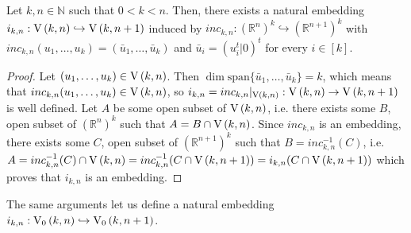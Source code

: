 \begin{lemma} Let $k,n\in\mathbb{N}$ such that $0<k<n$. Then, there exists a natural embedding $i_{k,n}:\St{k}{n}\hookrightarrow\St{k}{n+1}$ induced by $inc_{k,n}:(\mathbb{R}^n)^k\hookrightarrow(\mathbb{R}^{n+1})^k$ with $inc_{k,n}(u_1,\ldots,u_k)=(\bar{u}_1,\ldots,\bar{u}_k)$ and $\bar{u}_i=(u_i^t|0)^t$ for every $i\in[k]$.
\end{lemma}
\begin{proof} Let $(u_1,\ldots,u_k)\in\St{k}{n}$. Then $\dim\mathrm{span}\{\bar{u}_1,\ldots,\bar{u}_k\}=k$, which means that $inc_{k,n}(u_1,\ldots,u_k)\in\St{k}{n}$, so $i_{k,n}=inc_{k,n}|_{\St{k}{n}}:\St{k}{n}\to\St{k}{n+1}$ is well defined. Let $A$ be some open subset of $\St{k}{n}$, i.e. there exists some $B$, open subset of $(\mathbb{R}^n)^k$ such that $A=B\cap\St{k}{n}$. Since $inc_{k,n}$ is an embedding, there exists some $C$, open subset of $(\mathbb{R}^{n+1})^k$ such that $B=inc_{k,n}^{-1}(C)$, i.e. $A=inc_{k,n}^{-1}(C)\cap\St{k}{n}=inc_{k,n}^{-1}(C\cap\St{k}{n+1})=i_{k,n}(C\cap\St{k}{n+1})$ which proves that $i_{k,n}$ is an embedding.
\end{proof}
\begin{remark} The same arguments let us define a natural embedding $i_{k,n}:\StO{k}{n}\hookrightarrow\StO{k}{n+1}$.
\end{remark}

